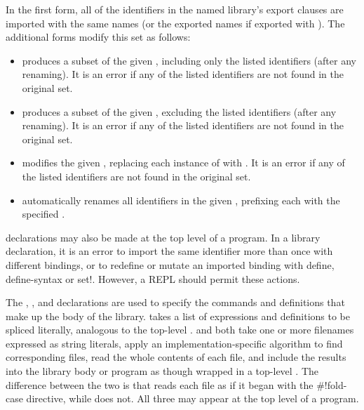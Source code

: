 In the first form, all of the identifiers in the named library's export
clauses are imported with the same names (or the exported names if
exported with ).  The additional 
forms modify this set as follows:

\begin{itemize}

\item {} produces a subset of the given
  , including only the listed identifiers (after any
  renaming).  It is an error if any of the listed identifiers are
  not found in the original set.

\item {} produces a subset of the given
  , excluding the listed identifiers (after any
  renaming). It is an error if any of the listed identifiers are not
  found in the original set.

\item {} modifies the given ,
  replacing each instance of  with
  . It is an error if any of the listed
  identifiers are not found in the original set.

\item {} automatically renames all identifiers in
  the given , prefixing each with the specified
  .

\end{itemize}

 declarations may also be made at the top level of a
program.  In a library declaration, it is an error to import the same
identifier more than once with different bindings, or to redefine or
mutate an imported binding with {\cf define}, {\cf define-syntax}
or {\cf set!}.  However, a REPL should permit these actions.

The , , and  declarations are
used to specify the commands and definitions that make up the body of
the library.   takes a list of expressions and definitions to be spliced
literally, analogous to the top-level .  
 and
 both take one or more filenames expressed as string literals,
apply an implementation-specific algorithm to find corresponding files,
read the whole contents of each file,
and include the results into the library body or program as
though wrapped in a top-level .
The difference between the two is that  reads each file
as if it began with the {\cf{}\#!fold-case} directive, while 
does not.
All three may appear at the top level of a program.

